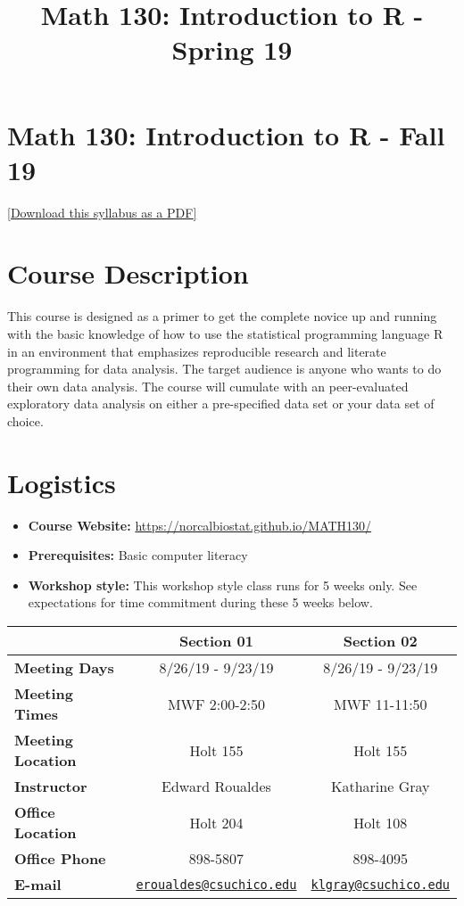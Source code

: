\documentclass[11pt,]{article}
\title{Math 130: Introduction to R - Spring 19}
\author{}
\date{}
\providecommand{\tightlist}{%
  \setlength{\itemsep}{0pt}\setlength{\parskip}{0pt}}
\begin{document}
\maketitle

\hypertarget{math-130-introduction-to-r---fall-19}{%
\section{Math 130: Introduction to R - Fall
19}\label{math-130-introduction-to-r---fall-19}}

\href{syllabus.pdf}{{[}Download this syllabus as a PDF{]}}

\hypertarget{course-description}{%
\section{Course Description}\label{course-description}}

This course is designed as a primer to get the complete novice up and
running with the basic knowledge of how to use the statistical
programming language R in an environment that emphasizes reproducible
research and literate programming for data analysis. The target audience
is anyone who wants to do their own data analysis. The course will
cumulate with an peer-evaluated exploratory data analysis on either a
pre-specified data set or your data set of choice.

\hypertarget{logistics}{%
\section{Logistics}\label{logistics}}

\begin{itemize}
\tightlist
\item
  \textbf{Course Website:}
  \url{https://norcalbiostat.github.io/MATH130/}
\item
  \textbf{Prerequisites:} Basic computer literacy\\
\item
  \textbf{Workshop style:} This workshop style class runs for 5 weeks
  only. See expectations for time commitment during these 5 weeks below.
\end{itemize}

\begin{longtable}[]{@{}lcc@{}}
\toprule
& Section 01 & Section 02\tabularnewline
\midrule
\endhead
\textbf{Meeting Days} & 8/26/19 - 9/23/19 & 8/26/19 -
9/23/19\tabularnewline
\textbf{Meeting Times} & MWF 2:00-2:50 & MWF 11-11:50\tabularnewline
\textbf{Meeting Location} & Holt 155 & Holt 155\tabularnewline
\textbf{Instructor} & Edward Roualdes & Katharine Gray\tabularnewline
\textbf{Office Location} & Holt 204 & Holt 108\tabularnewline
\textbf{Office Phone} & 898-5807 & 898-4095\tabularnewline
\textbf{E-mail} &
\href{mailto:eroualdes@csuchico.edu}{\nolinkurl{eroualdes@csuchico.edu}}
&
\href{mailto:klgray@csuchico.edu}{\nolinkurl{klgray@csuchico.edu}}\tabularnewline
\bottomrule
\end{longtable}
\end{document}
